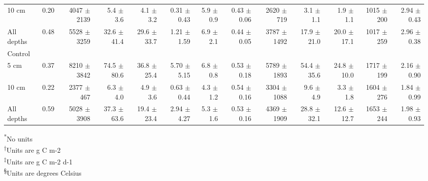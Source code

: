 \begin{longtable}{lrrrrrrrrrrrr}
10 cm & 0.20 & 4047 $\pm$ 2139 & 5.4 $\pm$ 3.6 & 4.1 $\pm$ 3.2 & 0.31 $\pm$ 0.43 & 5.9 $\pm$ 0.9 & 0.43 $\pm$ 0.06 & 2620 $\pm$ 719 & 3.1 $\pm$ 1.1 & 1.9 $\pm$ 1.1 & 1015 $\pm$ 200 & 2.94 $\pm$ 0.43 \\ 
All depths & 0.48 & 5528 $\pm$ 3259 & 32.6 $\pm$ 41.4 & 29.6 $\pm$ 33.7 & 1.21 $\pm$ 1.59 & 6.9 $\pm$ 2.1 & 0.44 $\pm$ 0.05 & 3787 $\pm$ 1492 & 17.9 $\pm$ 21.0 & 20.0 $\pm$ 17.1 & 1017 $\pm$ 259 & 2.96 $\pm$ 0.38 \\ 
\midrule
\multicolumn{1}{l}{Control} \\ 
\midrule
5 cm & 0.37 & 8210 $\pm$ 3842 & 74.5 $\pm$ 80.6 & 36.8 $\pm$ 25.4 & 5.70 $\pm$ 5.15 & 6.8 $\pm$ 0.8 & 0.53 $\pm$ 0.18 & 5789 $\pm$ 1893 & 54.4 $\pm$ 35.6 & 24.8 $\pm$ 10.0 & 1717 $\pm$ 199 & 2.16 $\pm$ 0.90 \\ 
10 cm & 0.22 & 2377 $\pm$ 467 & 6.3 $\pm$ 4.0 & 4.9 $\pm$ 3.6 & 0.63 $\pm$ 0.44 & 4.3 $\pm$ 1.2 & 0.54 $\pm$ 0.16 & 3304 $\pm$ 1088 & 9.6 $\pm$ 4.9 & 3.3 $\pm$ 1.8 & 1604 $\pm$ 276 & 1.84 $\pm$ 0.99 \\ 
All depths & 0.59 & 5028 $\pm$ 3908 & 37.3 $\pm$ 63.6 & 19.4 $\pm$ 23.4 & 2.94 $\pm$ 4.27 & 5.3 $\pm$ 1.6 & 0.53 $\pm$ 0.16 & 4369 $\pm$ 1909 & 28.8 $\pm$ 32.1 & 12.6 $\pm$ 12.7 & 1653 $\pm$ 244 & 1.98 $\pm$ 0.93 \\ 
\bottomrule
\end{longtable}
\vspace{-5mm}
\begin{minipage}{\linewidth}
\textsuperscript{*}No units \\ 
\textsuperscript{†}Units are g C m-2 \\ 
\textsuperscript{‡}Units are g C m-2 d-1 \\ 
\textsuperscript{§}Units are degrees Celsius \\ 
\end{minipage}

